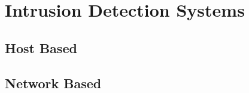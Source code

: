 \section{Intrusion Detection Systems}


\subsection{Host Based}
\begin{frame}



\end{frame}

\subsection{Network Based}
\begin{frame}



\end{frame}


